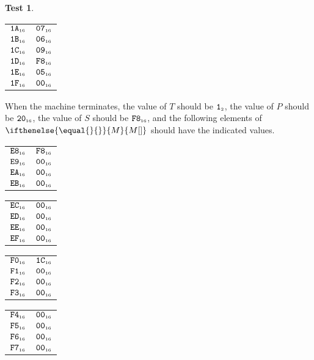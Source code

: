\documentclass[a4paper,12pt]{article}
\makeatletter
\newcommand{\num}[1]{\texttt{#1}}
\newcommand{\hex}[1]{\num{#1}_{\textup{\tiny 16}}}
\newcommand{\bin}[1]{\num{#1}_{\textup{\tiny 2}}}
\newcommand{\MEM}[1]{\ifthenelse{\equal{#1}{}}{M}{M[#1]}}
\newcommand{\PC}{P}
\newcommand{\SP}{S}
\newcommand{\TERM}{T}
\newcommand{\T}{\bin{1}}
\theoremstyle{definition}
\newtheorem{test}{Test}
\newenvironment{memtable}{%
  \begin{trivlist}
    \item
    }{%
    \end{trivlist}}
\newenvironment{memcolumn}{%
  \begin{tabular}{@{}ll@{}}
    \hline}
    {%
    \hline
  \end{tabular}}
\newcommand{\memspace}{\qquad}
\makeatother
\begin{document}
\begin{test}
\begin{memtable}
\begin{memcolumn}
      $\hex{1A}$ & $\hex{07}$ \\
      $\hex{1B}$ & $\hex{06}$ \\
      $\hex{1C}$ & $\hex{09}$ \\
      $\hex{1D}$ & $\hex{F8}$ \\
      $\hex{1E}$ & $\hex{05}$ \\
      $\hex{1F}$ & $\hex{00}$ \\
    \end{memcolumn}
  \end{memtable}
  When the machine terminates, the value of $\TERM$ should be $\T$, the value of $\PC$ should be $\hex{20}$, the value of $\SP$ should be $\hex{F8}$, and the following elements of $\MEM{}$ should have the indicated values.
  \begin{memtable}
    \begin{memcolumn}
      $\hex{E8}$ & $\hex{F8}$ \\
      $\hex{E9}$ & $\hex{00}$ \\
      $\hex{EA}$ & $\hex{00}$ \\
      $\hex{EB}$ & $\hex{00}$ \\
    \end{memcolumn}
    \memspace
    \begin{memcolumn}
      $\hex{EC}$ & $\hex{00}$ \\
      $\hex{ED}$ & $\hex{00}$ \\
      $\hex{EE}$ & $\hex{00}$ \\
      $\hex{EF}$ & $\hex{00}$ \\
    \end{memcolumn}
    \memspace
    \begin{memcolumn}
      $\hex{F0}$ & $\hex{1C}$ \\
      $\hex{F1}$ & $\hex{00}$ \\
      $\hex{F2}$ & $\hex{00}$ \\
      $\hex{F3}$ & $\hex{00}$ \\
    \end{memcolumn}
    \memspace
    \begin{memcolumn}
      $\hex{F4}$ & $\hex{00}$ \\
      $\hex{F5}$ & $\hex{00}$ \\
      $\hex{F6}$ & $\hex{00}$ \\
      $\hex{F7}$ & $\hex{00}$ \\
    \end{memcolumn}
    \memspace
    \begin{memcolumn}

\end{memcolumn}
\end{memtable}
\end{test}
\end{document}

